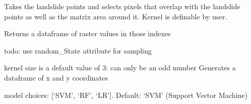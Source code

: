 \documentclass[letterpaper,10pt,english]{sphinxmanual}
\begin{document}
\begin{fulllineitems}
\begin{quote}
\begin{description}
\end{description}\end{quote}

\begin{fulllineitems}
\label{\detokenize{lhat:lhat.IO.inputs.generate_xy}}
Takes the landslide points and selects pixels that overlap with the landslide points
as well as the matrix area around it. Kernel is definable by user.

Returns a dataframe of raster values in those indexes

to\sphinxhyphen{}do: use random\_State attribute for sampling

\end{fulllineitems}


\begin{fulllineitems}
\label{\detokenize{lhat:lhat.IO.inputs.matrix_window}}
kernel size is a default value of 3: can only be an odd number
Generates a dataframe of x and y coordinates

\end{fulllineitems}


\begin{fulllineitems}
\label{\detokenize{lhat:lhat.IO.inputs.proximity2feature}}
\end{fulllineitems}


\begin{fulllineitems}
\label{\detokenize{lhat:lhat.IO.inputs.run_model}}
model choices:  {[}‘SVM’, ‘RF’, ‘LR’{]}. Default: ‘SVM’ (Support Vector Machine)


\end{fulllineitems}
\end{fulllineitems}
\end{document}
